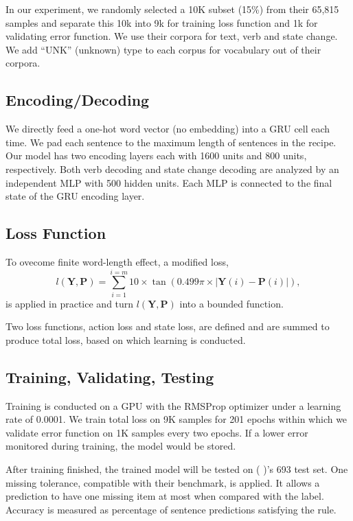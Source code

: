 \documentclass[letterpaper]{article}
\newcommand{\citealp}[1]{\citeauthor{#1} \citeyear{#1}}
\begin{document}
In our experiment, we randomly selected a 10K subset (15\%) from their 65,815 samples and separate this 10k into 9k for training loss function and 1k for validating error function. We use their corpora for text, verb and state change. We add ``UNK'' (unknown) type to each corpus for vocabulary out of their corpora.

\subsection*{Encoding/Decoding}
We directly feed a one-hot word vector (no embedding) into a GRU cell each time. We pad each sentence to the maximum length of sentences in the recipe. Our model has two encoding layers each with 1600 units and 800 units, respectively. Both verb decoding and state change decoding are analyzed by an independent MLP with 500 hidden units. Each MLP is connected to the final state of the GRU encoding layer.

\subsection*{Loss Function}
To ovecome finite word-length effect, a modified loss,
\begin{equation}
l(\mathbf{Y},\mathbf{P})=\sum_{i=1}^{i=m}10\times\tan(0.499\pi\times|\mathbf{Y}(i)-
\mathbf{P}(i)|),
\end{equation}
is applied in practice and turn $l(\mathbf{Y}, \mathbf{P})$ into a bounded function.

Two loss functions, action loss and state loss, are defined and are summed to produce total loss, based on which learning is conducted.

\subsection*{Training, Validating, Testing}
Training is conducted on a GPU with the RMSProp optimizer \cite{tieleman2012lecture} under a learning rate of 0.0001. We train total loss on 9K samples for 201 epochs within which we validate error function on 1K samples every two epochs. If a lower error monitored during training, the model would be stored.

After training finished, the trained model will be tested on (\citealp{bosselut2017simulating})'s 693 test set. One missing tolerance, compatible with their benchmark, is applied. It allows a prediction to have one missing item at most when compared with the label. Accuracy is measured as percentage of sentence predictions satisfying the rule.
\end{document}
